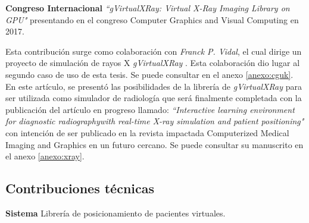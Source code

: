 \textbf{ Congreso Internacional }\emph{``gVirtualXRay: Virtual X-Ray Imaging Library on GPU"} \cite{sujar:hal} presentando en el congreso Computer Graphics and Visual Computing en 2017.

Esta contribución surge como colaboración con \emph{Franck P. Vidal}, el cual dirige un proyecto de simulación de rayos X \emph{gVirtualXRay} \cite{gVirtualXRay}. Esta colaboración dio lugar al segundo caso de uso de esta tesis. Se puede consultar en el anexo \ref{anexo:cguk}. En este artículo, se presentó las posibilidades de la librería de \emph{gVirtualXRay} para ser utilizada como simulador de radiología que será finalmente completada con la publicación del artículo en progreso llamado: \emph{``Interactive learning environment for diagnostic radiographywith real-time X-ray simulation and patient positioning"} con intención de ser publicado en la revista impactada Computerized Medical Imaging and Graphics en un futuro cercano. Se puede consultar su manuscrito en el anexo \ref{anexo:xray}.







\subsection{Contribuciones técnicas}
\label{conclu:tecnica}





\textbf{ Sistema } Librería de posicionamiento de pacientes virtuales.

